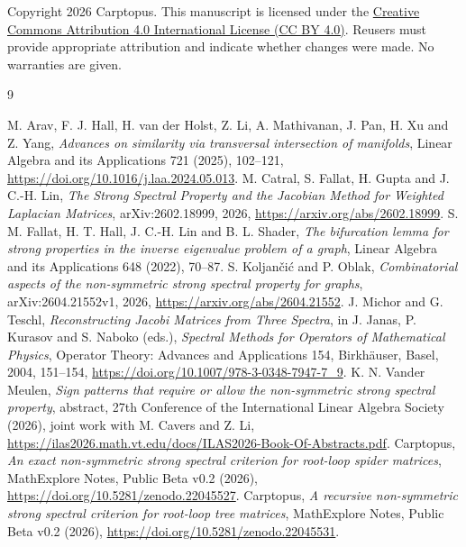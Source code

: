 \documentclass[11pt]{article}
\theoremstyle{remark}
\begin{document}
Copyright 2026 Carptopus. This manuscript is licensed under the
\href{https://creativecommons.org/licenses/by/4.0/}{Creative Commons Attribution 4.0 International License (CC BY 4.0)}.
Reusers must provide appropriate attribution and indicate whether changes were made. No warranties are
given.

\begin{thebibliography}{9}


 M. Arav, F. J. Hall, H. van der Holst, Z. Li, A. Mathivanan, J. Pan, H. Xu and Z. Yang,
   \emph{Advances on similarity via transversal intersection of manifolds}, Linear Algebra and its
   Applications 721 (2025), 102--121, \url{https://doi.org/10.1016/j.laa.2024.05.013}.
 M. Catral, S. Fallat, H. Gupta and J. C.-H. Lin,
   \emph{The Strong Spectral Property and the Jacobian Method for Weighted Laplacian Matrices},
   arXiv:2602.18999, 2026, \url{https://arxiv.org/abs/2602.18999}.
 S. M. Fallat, H. T. Hall, J. C.-H. Lin and B. L. Shader,
   \emph{The bifurcation lemma for strong properties in the inverse eigenvalue problem of a graph},
   Linear Algebra and its Applications 648 (2022), 70--87.
 S. Koljan\v{c}i\'{c} and P. Oblak,
   \emph{Combinatorial aspects of the non-symmetric strong spectral property for graphs},
   arXiv:2604.21552v1, 2026, \url{https://arxiv.org/abs/2604.21552}.
 J. Michor and G. Teschl,
   \emph{Reconstructing Jacobi Matrices from Three Spectra}, in J. Janas, P. Kurasov and S. Naboko (eds.),
   \emph{Spectral Methods for Operators of Mathematical Physics}, Operator Theory: Advances and Applications
   154, Birkhäuser, Basel, 2004, 151--154,
   \url{https://doi.org/10.1007/978-3-0348-7947-7_9}.
 K. N. Vander Meulen,
   \emph{Sign patterns that require or allow the non-symmetric strong spectral property},
   abstract, 27th Conference of the International Linear Algebra Society (2026),
   joint work with M. Cavers and Z. Li,
   \url{https://ilas2026.math.vt.edu/docs/ILAS2026-Book-Of-Abstracts.pdf}.
 Carptopus,
   \emph{An exact non-symmetric strong spectral criterion for root-loop spider matrices},
   MathExplore Notes, Public Beta v0.2 (2026),
   \url{https://doi.org/10.5281/zenodo.22045527}.
 Carptopus,
   \emph{A recursive non-symmetric strong spectral criterion for root-loop tree matrices},
   MathExplore Notes, Public Beta v0.2 (2026),
   \url{https://doi.org/10.5281/zenodo.22045531}.
\end{thebibliography}
\end{document}
